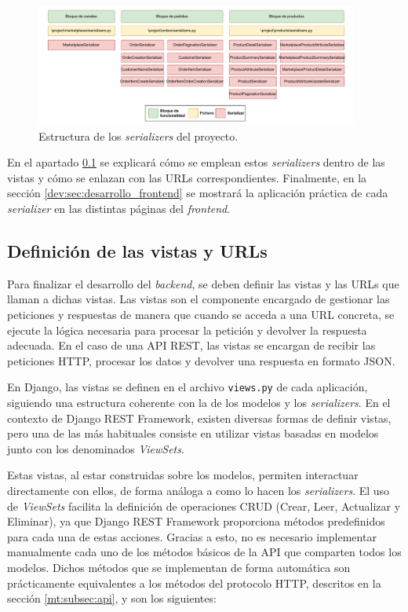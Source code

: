 \begin{figure}
    \centering
    \includegraphics[width=0.95\textwidth]{figures/design_develop/estructura_serializers.pdf}
    \caption{Estructura de los \textit{serializers} del proyecto.}
    \label{dev:fig:estructura_serializers}
\end{figure}

En el apartado \ref{dev:subsec:definicion_vistas_urls} se explicará cómo se emplean estos \textit{serializers} dentro de las vistas y cómo se enlazan con las URLs correspondientes. Finalmente, en la sección \ref{dev:sec:desarrollo_frontend} se mostrará la aplicación práctica de cada \textit{serializer} en las distintas páginas del \textit{frontend}.

\subsection{Definición de las vistas y URLs}
\label{dev:subsec:definicion_vistas_urls}

Para finalizar el desarrollo del \textit{backend}, se deben definir las vistas y las URLs que llaman a dichas vistas. Las vistas son el componente encargado de gestionar las peticiones y respuestas de manera que cuando se acceda a una URL concreta, se ejecute la lógica necesaria para procesar la petición y devolver la respuesta adecuada. En el caso de una API REST, las vistas se encargan de recibir las peticiones HTTP, procesar los datos y devolver una respuesta en formato JSON.

En Django, las vistas se definen en el archivo \texttt{views.py} de cada aplicación, siguiendo una estructura coherente con la de los modelos y los \textit{serializers}. En el contexto de Django REST Framework, existen diversas formas de definir vistas, pero una de las más habituales consiste en utilizar vistas basadas en modelos junto con los denominados \textit{ViewSets}.

Estas vistas, al estar construidas sobre los modelos, permiten interactuar directamente con ellos, de forma análoga a como lo hacen los \textit{serializers}. El uso de \textit{ViewSets} facilita la definición de operaciones CRUD (Crear, Leer, Actualizar y Eliminar), ya que Django REST Framework proporciona métodos predefinidos para cada una de estas acciones. Gracias a esto, no es necesario implementar manualmente cada uno de los métodos básicos de la API que comparten todos los modelos. Dichos métodos que se implementan de forma automática son prácticamente equivalentes a los métodos del protocolo HTTP, descritos en la sección \ref{mt:subsec:api}, y son los siguientes:

